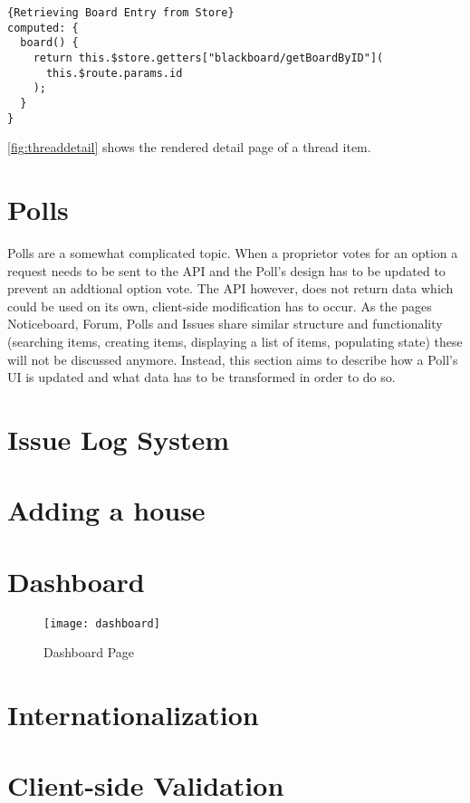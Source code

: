 \begin{lstlisting}[caption=Retrieving Board Entry from Store, captionpos=b, style=htmlcssjs, label=boardentrylookup]{Retrieving Board Entry from Store}
computed: {
  board() {
    return this.$store.getters["blackboard/getBoardByID"](
      this.$route.params.id
    );
  }
}
\end{lstlisting}

\autoref{fig:threaddetail} shows the rendered detail page of a thread item.

\section{Polls}
Polls are a somewhat complicated topic. When a proprietor votes for an option a request needs to be sent to the API and the Poll's design has to be updated to prevent an addtional option vote. The API however, does not return data which could be used on its own, client-side modification has to occur. As the pages Noticeboard, Forum, Polls and Issues share similar structure and functionality (searching items, creating items, displaying a list of items, populating state) these will not be discussed anymore. Instead, this section aims to describe how a Poll's UI is updated and what data has to be transformed in order to do so.

\section{Issue Log System}

\section{Adding a house}

\section{Dashboard}
\begin{figure}[H]
  \begin{center}
  \texttt{[image: dashboard]}
  \end{center}
  \caption{Dashboard Page}
  \label{fig:dashboard}
\end{figure}

\section{Internationalization} \label{sec:internationalization}

\section{Client-side Validation}

